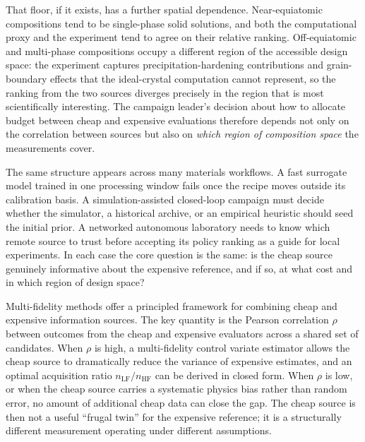 \documentclass[twoside,twocolumn,9pt]{article}
\begin{document}
That floor, if it exists, has a further spatial dependence. Near-equiatomic compositions tend to be single-phase solid solutions, and both the computational proxy and the experiment tend to agree on their relative ranking. Off-equiatomic and multi-phase compositions occupy a different region of the accessible design space: the experiment captures precipitation-hardening contributions and grain-boundary effects that the ideal-crystal computation cannot represent, so the ranking from the two sources diverges precisely in the region that is most scientifically interesting. The campaign leader's decision about how to allocate budget between cheap and expensive evaluations therefore depends not only on the correlation between sources but also on \emph{which region of composition space} the measurements cover.

The same structure appears across many materials workflows. A fast surrogate model trained in one processing window fails once the recipe moves outside its calibration basis.\cite{Pilania2016MultiFidelityCoKriging,Tran2020MFGP} A simulation-assisted closed-loop campaign must decide whether the simulator, a historical archive, or an empirical heuristic should seed the initial prior.\cite{Gongora2021SimulationTransfer} A networked autonomous laboratory needs to know which remote source to trust before accepting its policy ranking as a guide for local experiments.\cite{Yoshida2025NetworkedAutonomous} In each case the core question is the same: is the cheap source genuinely informative about the expensive reference, and if so, at what cost and in which region of design space?

Multi-fidelity methods offer a principled framework for combining cheap and expensive information sources.\cite{Peherstorfer2018SurveyMF,KennedyOHagan2000CoKriging,Forrester2007MultiFidelityOpt,Pilania2016MultiFidelityCoKriging,Tran2020MFGP} The key quantity is the Pearson correlation $\rho$ between outcomes from the cheap and expensive evaluators across a shared set of candidates. When $\rho$ is high, a multi-fidelity control variate estimator allows the cheap source to dramatically reduce the variance of expensive estimates, and an optimal acquisition ratio $n_\mathrm{LF}/n_\mathrm{HF}$ can be derived in closed form.\cite{Peherstorfer2018SurveyMF,KennedyOHagan2000CoKriging} When $\rho$ is low, or when the cheap source carries a systematic physics bias rather than random error, no amount of additional cheap data can close the gap. The cheap source is then not a useful ``frugal twin'' for the expensive reference; it is a structurally different measurement operating under different assumptions.\cite{Lo2024FrugalTwin,Baird2023CLSLabLight}
\end{document}
